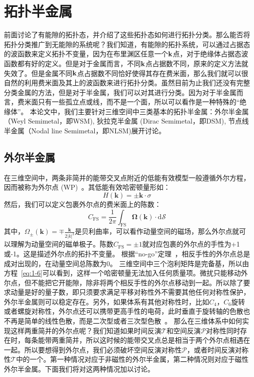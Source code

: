 \section{拓扑半金属}\label{sec:system}
前面讨论了有能隙的拓扑态，并介绍了这些拓扑态如何进行拓扑分类。那么能否将拓扑分类推广到无能隙的系统呢？我们知道，有能隙的拓扑系统，可以通过占据态的波函数来定义拓扑不变量，因为在布里渊区任意一个$\bold{k}$点，对于绝缘体占据态波函数都有好的定义。但是对于金属而言，不同$\bold{k}$点占据数不同，原来的定义方法就失效了。但是金属不同$\bold{k}$点占据数不同恰好使得其存在费米面，那么我们就可以很自然的利用费米面及其上的波函数来进行拓扑分类。虽然目前为止我们还没有完整分类金属的方法，但是对于半金属，我们可以对其进行分类。因为对于半金属而言，费米面只有一些孤立点或线，而不是一个面，所以可以看作是一种特殊的“绝缘体”。
本论文中，我们主要针对三维空间中三类基本的拓扑半金属：外尔半金属（Weyl Semimetal，即WSM), 狄拉克半金属 (Dirac Semimetal，即DSM), 节点线半金属（Nodal line Semimetal，即NLSM)展开讨论。

\subsection{外尔半金属}\label{sec:weyl}
在三维空间中，两条非简并的能带交叉点附近的低能有效模型一般遵循外尔方程，因而被称为外尔点 (WP)~\citep{1929weyl}。其低能有效哈密顿量形如：
\begin{equation}
    \label{eq:1-6}
    H(\mathbf{k})= \pm \mathbf{k} \cdot \sigma
\end{equation}
然后，我们可以定义包裹外尔点的费米面上的陈数：
\begin{equation}
    \label{eq:1-7}
    C_{\mathrm{FS}}=\frac{1}{2 \pi} \int_{\mathrm{FS}} \boldsymbol{\Omega}(\mathbf{k}) \cdot \mathrm{d} \mathcal{S}
\end{equation}
其中，$\Omega_{\pm}(\mathbf{k})=\mp \frac{\mathbf{k}}{2|k|^{3}}$是贝利曲率，可以看作动量空间的磁场，那么外尔点就可以理解为动量空间的磁单极子。陈数$C_{\mathrm{FS}}=\pm 1$就对应包裹的外尔点的手性为+1或-1。这是描述外尔点的拓扑不变量。
根据“no-go”定理~\citep{NIELSEN198120,NIELSEN1981173}，相反手性的外尔点总是成对出现的，在动量空间总陈数为0。
三维空间中三个泡利矩阵是完备基，所以由方程~\ref{eq:1-6}可以看到，这样一个哈密顿量无法加入任何质量项。微扰只能移动外尔点，但不能把它开能隙，除非将两个相反手性的外尔点移动到一起。所以除了要求动量是好的量子数，即只须要求满足平移对称性外不需要其他任何对称性保护，外尔半金属则可以稳定存在。另外，如果体系有其他对称性时，比如$C_4$，$C_6$旋转或者螺旋对称性，外尔点还可以携带更高手性的电荷，此时垂直于旋转轴的色散也不再是简单的线性色散，而是二次型或者三次型色散~\citep{Fang2012,Tsirkin2017}。
那么在三维体系中如何实现这样两重简并的外尔点呢？我们知道如果时间反演$\mathcal{T}$和空间反演$\mathcal{P}$对称性同时存在时，每条能带两重简并，所以这时候的能带交叉点总是相当于两个外尔点相遇在一起。所以要想得到外尔点，我们必须破坏空间反演对称性$\mathcal{P}$，或者时间反演对称性$\mathcal{T}$中的一个。第一种情况对应于非磁性的外尔半金属，第二种情况则对应于磁性外尔半金属。下面我们将对这两种情况加以讨论。

